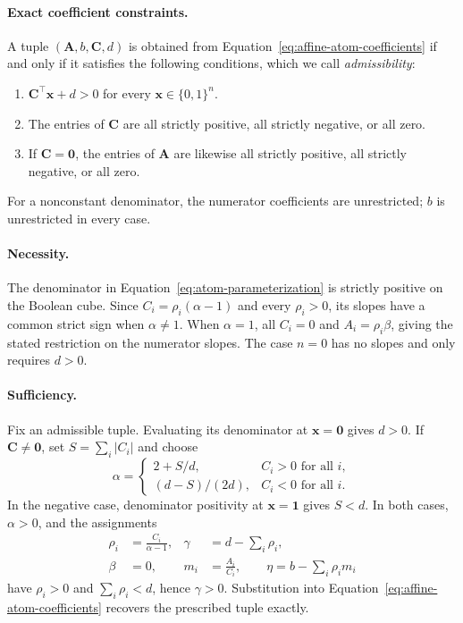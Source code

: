 \documentclass{article}
\theoremstyle{definition}
\theoremstyle{plain}
\newcommand{\bits}{\{0,1\}}
\begin{document}
\paragraph{Exact coefficient constraints.}
A tuple $(\mathbf{A},b,\mathbf{C},d)$ is obtained from Equation~\eqref{eq:affine-atom-coefficients} if and only if it satisfies the following conditions, which we call \emph{admissibility}:
\begin{enumerate}[label=(\roman*),leftmargin=*,nosep]
  \item $\mathbf{C}^{\top}\mathbf{x}+d>0$ for every $\mathbf{x}\in\bits^n$.
  \item The entries of $\mathbf{C}$ are all strictly positive, all strictly negative, or all zero.
  \item If $\mathbf{C}=\mathbf{0}$, the entries of $\mathbf{A}$ are likewise all strictly positive, all strictly negative, or all zero.
\end{enumerate}
For a nonconstant denominator, the numerator coefficients are unrestricted; $b$ is unrestricted in every case.

\paragraph{Necessity.}
The denominator in Equation~\eqref{eq:atom-parameterization} is strictly positive on the Boolean cube. Since $C_i=\rho_i(\alpha-1)$ and every $\rho_i>0$, its slopes have a common strict sign when $\alpha\ne1$. When $\alpha=1$, all $C_i=0$ and $A_i=\rho_i\beta$, giving the stated restriction on the numerator slopes. The case $n=0$ has no slopes and only requires $d>0$.

\paragraph{Sufficiency.}
Fix an admissible tuple. Evaluating its denominator at $\mathbf{x}=\mathbf{0}$ gives $d>0$. If $\mathbf{C}\ne\mathbf{0}$, set $S=\sum_i|C_i|$ and choose
\begin{equation}
\alpha=\begin{cases}
2+S/d, & C_i>0\text{ for all }i,\\
(d-S)/(2d), & C_i<0\text{ for all }i.
\end{cases}
\end{equation}
In the negative case, denominator positivity at $\mathbf{x}=\mathbf{1}$ gives $S<d$. In both cases, $\alpha>0$, and the assignments
\begin{equation}
\begin{aligned}
\rho_i&=\frac{C_i}{\alpha-1},
& \gamma&=d-\sum_i\rho_i,\\
\beta&=0,
& m_i&=\frac{A_i}{C_i},
\qquad \eta=b-\sum_i\rho_i m_i
\end{aligned}
\end{equation}
have $\rho_i>0$ and $\sum_i\rho_i<d$, hence $\gamma>0$. Substitution into Equation~\eqref{eq:affine-atom-coefficients} recovers the prescribed tuple exactly.
\end{document}
